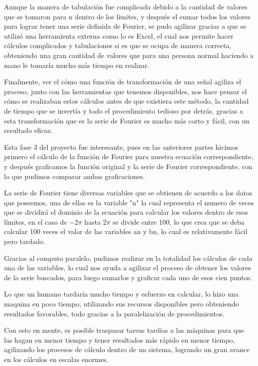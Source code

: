 Aunque la manera de tabulación fue complicada debido a la cantidad de valores que se tomaron para n dentro de los límites, y después el sumar todos los valores para lograr tener una serie definida de Fourier, se pudo agilizar gracias a que se utilizó una herramienta externa como lo es Excel, el cual nos permite hacer cálculos complicados y tabulaciones si es que se ocupa de manera correcta, obteniendo una gran cantidad de valores que para una persona normal haciendo a mano le tomaría mucho más tiempo en realizar.

Finalmente, ver el cómo una función de transformación de una señal agiliza el proceso, junto con las herramientas que tenemos disponibles, nos hace pensar el cómo se realizaban estos cálculos antes de que existiera este método, la cantidad de tiempo que se invertía y todo el procedimiento tedioso por detrás, gracias a esta transformación que es la serie de Fourier es mucho más corto y fácil, con un resultado eficaz.

Esta fase 3 del proyecto fue interesante, pues en las anteriores partes hicimos primero el cálculo de la función de Fourier para nuestra ecuación correspondiente, y después graficamos la función original y la serie de Fourier correspondiente, con lo que pudimos comparar ambas graficaciones.

La serie de Fourier tiene diversas variables que se obtienen de acuerdo a los datos que poseemos, una de ellas es la variable "n" la cual representa el numero de veces que se dividirá el dominio de la ecuación para calcular los valores dentro de esos límites, en el caso de \(-2 \pi\) hasta \(2 \pi\) se divide entre 100, lo que crea que se deba calcular 100 veces el valor de las variables an y bn, lo cual es relativamente fácil pero tardado.

Gracias al computo paralelo, pudimos realizar en la totalidad los cálculos de cada una de las variables, lo cual nos ayuda a agilizar el proceso de obtener los valores de la serie buscados, para luego sumarlos y graficar cada uno de esos cien puntos.

Lo que un humano tardaría mucho tiempo y esfuerzo en calcular, lo hizo una maquina en poco tiempo, utilizando sus recursos disponibles pero obteniendo resultados favorables, todo gracias a la paralelización de procedimientos.

Con esto en mente, es posible traspasar tareas tardías a las máquinas para que las hagan en menor tiempo y tener resultados más rápido en menor tiempo, agilizando los procesos de cálculo dentro de un sistema, logrando un gran avance en los cálculos en escalas enormes.

